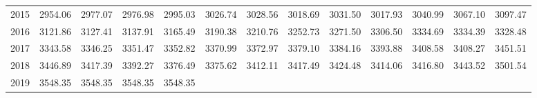 \begin{longtable}{rrrrrrrrrrrrr}
  2015 & 2954.06 & 2977.07 & 2976.98 & 2995.03 & 3026.74 & 3028.56 & 3018.69 & 3031.50 & 3017.93 & 3040.99 & 3067.10 & 3097.47 \\ 
  2016 & 3121.86 & 3127.41 & 3137.91 & 3165.49 & 3190.38 & 3210.76 & 3252.73 & 3271.50 & 3306.50 & 3334.69 & 3334.39 & 3328.48 \\ 
  2017 & 3343.58 & 3346.25 & 3351.47 & 3352.82 & 3370.99 & 3372.97 & 3379.10 & 3384.16 & 3393.88 & 3408.58 & 3408.27 & 3451.51 \\ 
  2018 & 3446.89 & 3417.39 & 3392.27 & 3376.49 & 3375.62 & 3412.11 & 3417.49 & 3424.48 & 3414.06 & 3416.80 & 3443.52 & 3501.54 \\ 
  2019 & 3548.35 & 3548.35 & 3548.35 & 3548.35 &  &  &  &  &  &  &  &  \\ 
   \hline
\hline
\end{longtable}
